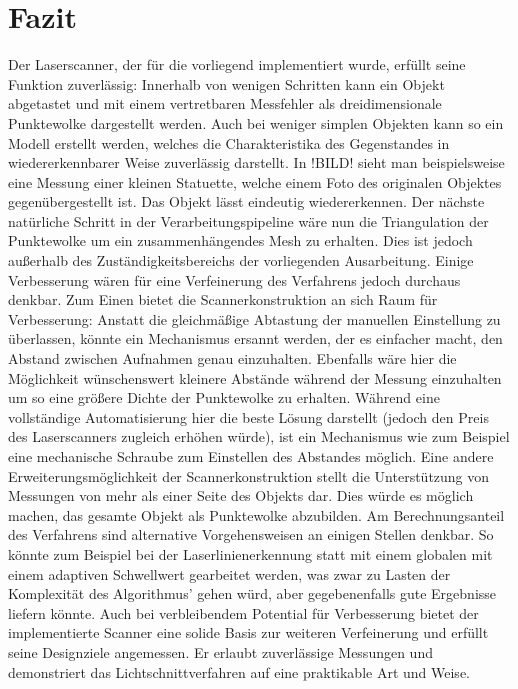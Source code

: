 \chapter{Fazit}
Der Laserscanner, der für die vorliegend implementiert wurde, erfüllt seine Funktion zuverlässig: Innerhalb von wenigen Schritten kann ein Objekt abgetastet und mit einem vertretbaren Messfehler als dreidimensionale Punktewolke dargestellt werden. Auch bei weniger simplen Objekten kann so ein Modell erstellt werden, welches die Charakteristika des Gegenstandes in wiedererkennbarer Weise zuverlässig darstellt. In !BILD! sieht man beispielsweise eine Messung einer kleinen Statuette, welche einem Foto des originalen Objektes gegenübergestellt ist. Das Objekt lässt eindeutig wiedererkennen. Der nächste natürliche Schritt in der Verarbeitungspipeline wäre nun die Triangulation der Punktewolke um ein zusammenhängendes Mesh zu erhalten. Dies ist jedoch außerhalb des Zu\-stän\-dig\-keits\-bereichs der vorliegenden Ausarbeitung.\newline
Einige Verbesserung wären für eine Verfeinerung des Verfahrens jedoch durchaus denkbar. Zum Einen bietet die Scannerkonstruktion an sich Raum für Verbesserung: Anstatt die gleichmäßige Abtastung der manuellen Einstellung zu überlassen, könnte ein Mechanismus ersannt werden, der es einfacher macht, den Abstand zwischen Aufnahmen genau einzuhalten. Ebenfalls wäre hier die Möglichkeit wünschenswert kleinere Abstände während der Messung einzuhalten um so eine größere Dichte der Punktewolke zu erhalten. Während eine vollständige Automatisierung hier die beste Lösung darstellt (jedoch den Preis des Laserscanners zugleich erhöhen würde), ist ein Mechanismus wie zum Beispiel eine mechanische Schraube zum Einstellen des Abstandes möglich. Eine andere Erweiterungsmöglichkeit der Scannerkonstruktion stellt die Unterstützung von Messungen von mehr als einer Seite des Objekts dar. Dies würde es möglich machen, das gesamte Objekt als Punktewolke abzubilden. Am Berechnungsanteil des Verfahrens sind alternative Vorgehensweisen an einigen Stellen denkbar. So könnte zum Beispiel bei der Laserlinienerkennung statt mit einem globalen mit einem adaptiven Schwellwert gearbeitet werden, was zwar zu Lasten der Komplexität des Algorithmus' gehen würd, aber gegebenenfalls gute Ergebnisse liefern könnte. \newline
Auch bei verbleibendem Potential für Verbesserung bietet der implementierte Scanner eine solide Basis zur weiteren Verfeinerung und erfüllt seine Designziele angemessen. Er erlaubt zuverlässige Messungen und demonstriert das Lichtschnittverfahren auf eine praktikable Art und Weise. 